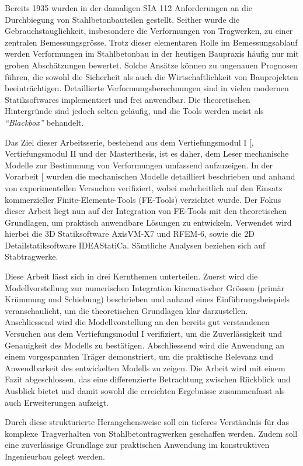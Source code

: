 \documentclass[
  11pt,
  letterpaper,
]{scrreprt}
\begin{document}
Bereits 1935 wurden in der damaligen SIA 112 Anforderungen an die
Durchbiegung von Stahlbetonbauteilen gestellt. Seither wurde die
Gebrauchstauglichkeit, insbesondere die Verformungen von Tragwerken, zu
einer zentralen Bemessungsgrösse. Trotz dieser elementaren Rolle im
Bemessungsablauf werden Verformungen im Stahlbetonbau in der heutigen
Baupraxis häufig nur mit groben Abschätzungen bewertet. Solche Ansätze
können zu ungenauen Prognosen führen, die sowohl die Sicherheit als auch
die Wirtschaftlichkeit von Bauprojekten beeinträchtigen. Detaillierte
Verformungsberechnungen sind in vielen modernen Statiksoftwares
implementiert und frei anwendbar. Die theoretischen Hintergründe sind
jedoch selten geläufig, und die Tools werden meist als
\emph{``Blackbox''} behandelt.

Das Ziel dieser Arbeitsserie, bestehend aus dem Vertiefungsmodul I
{[}\citeproc{ref-gitz_ansatze_2024}{1}{]}, Vertiefungsmodul II und der
Masterthesis, ist es daher, dem Leser mechanische Modelle zur Bestimmung
von Verformungen umfassend aufzuzeigen. In der Vorarbeit
{[}\citeproc{ref-gitz_ansatze_2024}{1}{]} wurden die mechanischen
Modelle detailliert beschrieben und anhand von experimentellen Versuchen
verifiziert, wobei mehrheitlich auf den Einsatz kommerzieller
Finite-Elemente-Tools (FE-Tools) verzichtet wurde. Der Fokus dieser
Arbeit liegt nun auf der Integration von FE-Tools mit den theoretischen
Grundlagen, um praktisch anwendbare Lösungen zu entwickeln. Verwendet
wird hierbei die 3D Statiksoftware AxisVM-X7 und RFEM-6, sowie die 2D
Detailstatiksoftware IDEAStatiCa. Sämtliche Analysen beziehen sich auf
Stabtragwerke.

Diese Arbeit lässt sich in drei Kernthemen unterteilen. Zuerst wird die
Modellvorstellung zur numerischen Integration kinematischer Grössen
(primär Krümmung und Schiebung) beschrieben und anhand eines
Einführungsbeispiels veranschaulicht, um die theoretischen Grundlagen
klar darzustellen. Anschliessend wird die Modellvorstellung an den
bereits gut verstandenen Versuchen aus dem Vertiefungsmodul I
verifiziert, um die Zuverlässigkeit und Genauigkeit des Modells zu
bestätigen. Abschliessend wird die Anwendung an einem vorgespannten
Träger demonstriert, um die praktische Relevanz und Anwendbarkeit des
entwickelten Modells zu zeigen. Die Arbeit wird mit einem Fazit
abgeschlossen, das eine differenzierte Betrachtung zwischen Rückblick
und Ausblick bietet und damit sowohl die erreichten Ergebnisse
zusammenfasst als auch Erweiterungen aufzeigt.

Durch diese strukturierte Herangehensweise soll ein tieferes Verständnis
für das komplexe Tragverhalten von Stahlbetontragwerken geschaffen
werden. Zudem soll eine zuverlässige Grundlage zur praktischen Anwendung
im konstruktiven Ingenieurbau gelegt werden.
\end{document}
